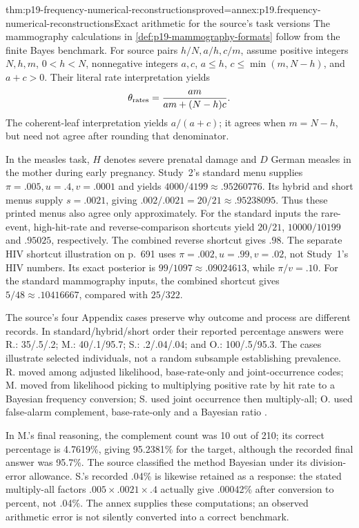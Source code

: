 \begin{hbtheorem}{thm:p19-frequency-numerical-reconstructions}{proved=annex:p19.frequency-numerical-reconstructions}{Exact arithmetic for the source's task versions}
The mammography calculations in \cref{def:p19-mammography-formats} follow
from the finite Bayes benchmark. For source pairs \(h/N,a/h,c/m\), assume
positive integers \(N,h,m\), \(0<h<N\), nonnegative integers \(a,c\),
\(a\leq h\), \(c\leq\min(m,N-h)\), and \(a+c>0\).
Their literal rate interpretation yields
\[
 \theta_{\rm rates}=\frac{am}{am+(N-h)c}.
\]
The coherent-leaf interpretation yields \(a/(a+c)\); it agrees when
\(m=N-h\), but need not agree after rounding that denominator.

In the measles task, \(H\) denotes severe prenatal damage and \(D\)
German measles in the mother during early pregnancy. Study~2's standard
menu supplies \(\pi=.005,u=.4,v=.0001\)
and yields \(4000/4199\approx.95260776\). Its hybrid and short menus
supply \(s=.0021\), giving \(.002/.0021=20/21\approx.95238095\).
Thus these printed menus also agree only approximately. For the standard
inputs the rare-event, high-hit-rate and reverse-comparison shortcuts yield
\(20/21\), \(10000/10199\) and \(.95025\), respectively. The combined
reverse shortcut gives \(.98\).
The separate HIV shortcut illustration on p.~691 uses
\(\pi=.002,u=.99,v=.02\), not Study~1's HIV numbers. Its exact
posterior is \(99/1097\approx.09024613\), while \(\pi/v=.10\).
For the standard mammography inputs, the combined shortcut gives
\(5/48\approx.10416667\), compared with \(25/322\).
\end{hbtheorem}

The source's four Appendix cases preserve why outcome and process are
different records. In standard/hybrid/short order their reported percentage
answers were R.: 35/.5/.2; M.: 40/.1/95.7; S.: .2/.04/.04; and
O.: 100/.5/95.3. The cases illustrate selected individuals, not a random
subsample establishing prevalence. R. moved among adjusted likelihood,
base-rate-only and joint-occurrence codes; M. moved from likelihood picking
to multiplying positive rate by hit rate to a Bayesian frequency conversion;
S. used joint occurrence then multiply-all; O. used false-alarm complement,
base-rate-only and a Bayesian ratio
\cite[p.~704]{GigerenzerHoffrage1995FrequencyFormats}.

In M.'s final reasoning, the complement count was 10 out of 210; its correct
percentage is 4.7619\%, giving 95.2381\% for the target, although the
recorded final answer was 95.7\%. The source classified the method Bayesian
under its division-error allowance. S.'s recorded .04\% is likewise retained
as a response: the stated multiply-all factors \(.005\times.0021\times.4\)
actually give .00042\% after conversion to percent, not .04\%. The
annex supplies these computations; an observed arithmetic error is not
silently converted into a correct benchmark.

